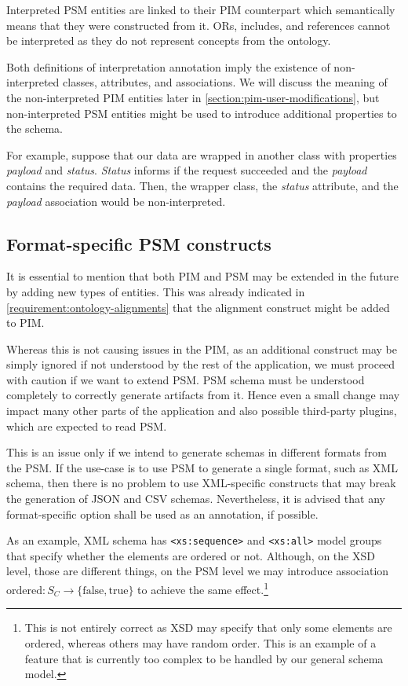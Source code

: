 Interpreted PSM entities are linked to their PIM counterpart which semantically means that they were constructed from it. ORs, includes, and references cannot be interpreted as they do not represent concepts from the ontology.

\medskip

Both definitions of interpretation annotation imply the existence of non-interpreted classes, attributes, and associations. We will discuss the meaning of the non-interpreted PIM entities later in \autoref{section:pim-user-modifications}, but non-interpreted PSM entities might be used to introduce additional properties to the schema.

For example, suppose that our data are wrapped in another class with properties \textit{payload} and \textit{status}. \textit{Status} informs if the request succeeded and the \textit{payload} contains the required data. Then, the wrapper class, the \textit{status} attribute, and the \textit{payload} association would be non-interpreted.

\subsection{Format-specific PSM constructs}

It is essential to mention that both PIM and PSM may be extended in the future by adding new types of entities. This was already indicated in \autoref{requirement:ontology-alignments} that the alignment construct might be added to PIM.

Whereas this is not causing issues in the PIM, as an additional construct may be simply ignored if not understood by the rest of the application, we must proceed with caution if we want to extend PSM. PSM schema must be understood completely to correctly generate artifacts from it. Hence even a small change may impact many other parts of the application and also possible third-party plugins, which are expected to read PSM.

This is an issue only if we intend to generate schemas in different formats from the PSM. If the use-case is to use PSM to generate a single format, such as XML schema, then there is no problem to use XML-specific constructs that may break the generation of JSON and CSV schemas. Nevertheless, it is advised that any format-specific option shall be used as an annotation, if possible.

As an example, XML schema has \verb|<xs:sequence>| and \verb|<xs:all>| model groups that specify whether the elements are ordered or not. Although, on the XSD level, those are different things, on the PSM level we may introduce association $\textrm{ordered}: S_C \rightarrow \{\textrm{false}, \textrm{true}\}$ to achieve the same effect.\footnote{This is not entirely correct as XSD may specify that only some elements are ordered, whereas others may have random order. This is an example of a feature that is currently too complex to be handled by our general schema model.}

